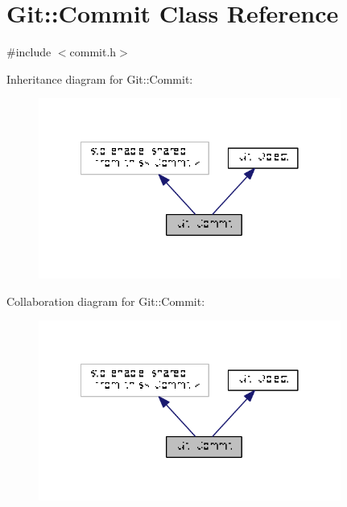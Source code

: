 \hypertarget{class_git_1_1_commit}{\section{Git\-:\-:Commit Class Reference}
\label{class_git_1_1_commit}
}


{\ttfamily \#include $<$commit.\-h$>$}



Inheritance diagram for Git\-:\-:Commit\-:\nopagebreak
\begin{figure}[H]
\begin{center}
\leavevmode
\includegraphics[width=281pt]{class_git_1_1_commit__inherit__graph}
\end{center}
\end{figure}


Collaboration diagram for Git\-:\-:Commit\-:\nopagebreak
\begin{figure}[H]
\begin{center}
\leavevmode
\includegraphics[width=281pt]{class_git_1_1_commit__coll__graph}
\end{center}
\end{figure}
